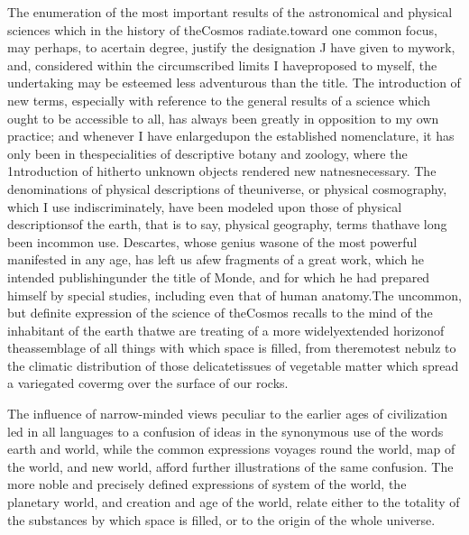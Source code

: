 The enumeration of the most important results of the astronomical and physical sciences which in the history of theCosmos radiate.toward one common focus, may perhaps, to acertain degree, justify the designation J have given to mywork, and, considered within the circumscribed limits I haveproposed to myself, the undertaking may be esteemed less adventurous than the title. The introduction of new terms, especially with reference to the general results of a science which ought to be accessible to all, has always been greatly in opposition to my own practice; and whenever I have enlargedupon the established nomenclature, it has only been in thespecialities of descriptive botany and zoology, where the 1ntroduction of hitherto unknown objects rendered new natnesnecessary. The denominations of physical descriptions of theuniverse, or physical cosmography, which I use indiscriminately, have been modeled upon those of physical descriptionsof the earth, that is to say, physical geography, terms thathave long been incommon use. Descartes, whose genius wasone of the most powerful manifested in any age, has left us afew fragments of a great work, which he intended publishingunder the title of Monde, and for which he had prepared himself by special studies, including even that of human anatomy.The uncommon, but definite expression of the science of theCosmos recalls to the mind of the inhabitant of the earth thatwe are treating of a more widelyextended horizonof theassemblage of all things with which space is filled, from theremotest nebulz to the climatic distribution of those delicatetissues of vegetable matter which spread a variegated covermg over the surface of our rocks.

The influence of narrow-minded views peculiar to the earlier ages of civilization led in all languages to a confusion of ideas in the synonymous use of the words earth and world, while the common expressions voyages round the world, map of the world, and new world, afford further illustrations of the same confusion. The more noble and precisely defined expressions of system of the world, the planetary world, and creation and age of the world, relate either to the totality of the substances by which space is filled, or to the origin of the whole universe.

